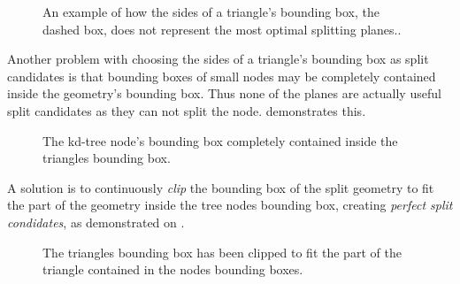 \begin{figure}
  \centering

  \vspace{3mm}
  \parbox{5cm}{\caption[Triangle/Node bounding box intersection.]{An
      example of how the sides of a triangle's bounding box, the
      dashed box, does not represent the most optimal splitting
      planes..}\label{fig:aabbSplit}}
\end{figure}

Another problem with choosing the sides of a triangle's bounding box
as split candidates is that bounding boxes of small nodes may be
completely contained inside the geometry's bounding box. Thus none of
the planes are actually useful split candidates as they can not split
the node.  demonstrates this.

\begin{figure}
  \centering
    
  \vspace{3mm}
  \parbox{5cm}{\caption[A tree node's bounding box contained in a
      triangle's bounding box.]{The kd-tree node's bounding box
      completely contained inside the triangles bounding
      box.}\label{fig:aabbContained}}
\end{figure}

A solution is to continuously \textit{clip} the bounding box of the
split geometry to fit the part of the geometry inside the tree nodes
bounding box, creating \textit{perfect split condidates}, as
demonstrated on .

\begin{figure}
  \centering

  \vspace{3mm}
  \parbox{5cm}{ \caption[Triangle clipping.]{The triangles bounding
      box has been clipped to fit the part of the triangle contained
      in the nodes bounding boxes.}\label{fig:aabbClipped}}
\end{figure}


